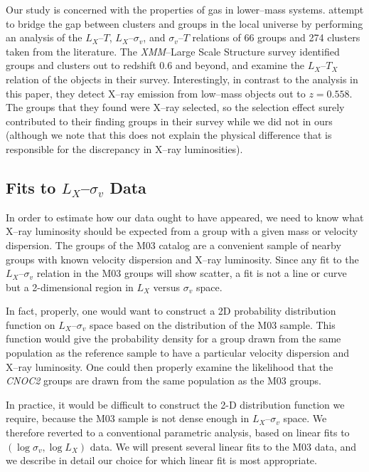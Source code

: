 Our study is concerned with the properties of gas in lower--mass
systems.  \citet{xue+wu2000} attempt to bridge the gap between
clusters and groups in the local universe by performing an analysis of
the $L_X$--$T$, $L_X$--$\sigma_v$, and $\sigma_v$--$T$ relations of 66
groups and 274 clusters taken from the literature.  The
\textsl{XMM}--Large Scale Structure survey identified groups and
clusters out to redshift 0.6 and beyond, and \citet{willis_et_al2005}
examine the $L_X$--$T_X$ relation of the objects in their survey.
Interestingly, in contrast to the analysis in this paper, they detect
X--ray emission from low--mass objects out to $z=0.558$.
The groups that they found were X--ray selected, so the selection effect
surely contributed to their finding groups in their survey while
we did not in ours (although we note that this does not explain the physical
difference that is responsible for the discrepancy in X--ray luminosities).


\subsection{Fits to $L_X$--$\sigma_v$ Data}
\label{groups_subsec:fits}
In order to estimate how our data ought to have appeared, we need to
know what X--ray luminosity should be expected from a group with a
given mass or velocity dispersion.  The groups of the M03 catalog are
a convenient sample of nearby groups with known velocity dispersion
and X--ray luminosity.  Since any fit to the $L_X$--$\sigma_v$
relation in the M03 groups will show scatter, a fit is not a line or
curve but a 2-dimensional region in $L_X$ versus $\sigma_v$ space.

In fact, properly, one would want to construct a 2D probability
distribution function on $L_X$--$\sigma_v$ space based on the
distribution of the M03 sample.  This function would give the
probability density for a group drawn from the same population as the
reference sample to have a particular velocity dispersion and X--ray
luminosity. One could then properly examine the likelihood that the
\textsl{CNOC2} groups are drawn from the same population as the M03
groups.

In practice, it would be difficult to construct the 2-D distribution
function we require, because the M03 sample is not dense enough in
$L_X$--$\sigma_v$ space.  We therefore reverted to a conventional
parametric analysis, based on linear fits to $(\log \sigma_v, \log
L_X)$ data.  We will present several linear fits to the M03 data, and
we describe in detail our choice for which linear fit is most
appropriate.

